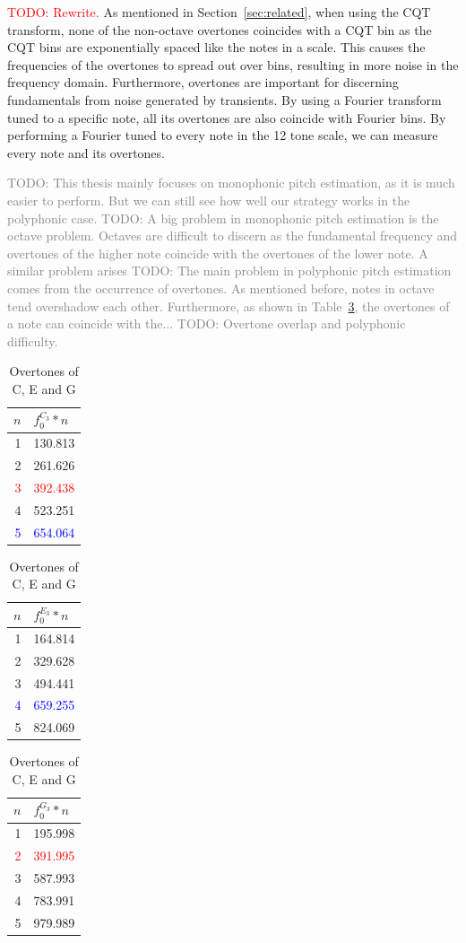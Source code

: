 \documentclass[10pt,twocolumn]{article}
\begin{document}
\textcolor{red}{TODO: Rewrite.}
As mentioned in Section~\ref{sec:related}, when using the CQT transform, none of the non-octave overtones coincides with a CQT bin as the CQT bins are exponentially spaced like the notes in a scale. This causes the frequencies of the overtones to spread out over bins, resulting in more noise in the frequency domain. Furthermore, overtones are important for discerning fundamentals from noise generated by transients. By using a Fourier transform tuned to a specific note, all its overtones are also coincide with Fourier bins. By performing a Fourier tuned to every note in the 12 tone scale, we can measure every note and its overtones.

\textcolor{gray}{TODO: This thesis mainly focuses on monophonic pitch estimation, as it is much easier to perform. But we can still see how well our strategy works in the polyphonic case.
TODO: A big problem in monophonic pitch estimation is the octave problem. Octaves are difficult to discern as the fundamental frequency and overtones of the higher note coincide with the overtones of the lower note. A similar problem arises
TODO: The main problem in polyphonic pitch estimation comes from the occurrence of overtones. As mentioned before, notes in octave tend overshadow each other. Furthermore, as shown in Table~\ref{tab:overtones}, the overtones of a note can coincide with the...
TODO: Overtone overlap and polyphonic difficulty.}
\begin{table}[H]
    \centering
    \hfill
    \begin{tabular}{r|l}
        $n$ & $f^{C_3}_0*n$ \\
        \hline
        1 & 130.813 \\
        2 & 261.626 \\
        \textcolor{red}{3} & \textcolor{red}{392.438} \\
        4 & 523.251 \\
        \textcolor{blue}{5} & \textcolor{blue}{654.064}
    \end{tabular}
    \hfill
    \begin{tabular}{r|l}
        $n$ & $f^{E_3}_0*n$ \\
        \hline
        1 & 164.814 \\
        2 & 329.628 \\
        3 & 494.441 \\
        \textcolor{blue}{4} & \textcolor{blue}{659.255} \\
        5 & 824.069
    \end{tabular}
    \hfill
    \begin{tabular}{r|l}
        $n$ & $f^{G_3}_0*n$ \\
        \hline
        1 & 195.998 \\
        \textcolor{red}{2} & \textcolor{red}{391.995} \\
        3 & 587.993 \\
        4 & 783.991 \\
        5 & 979.989
    \end{tabular}
    \hfill
    \caption{Overtones of C, E and G}
    \label{tab:overtones}
\end{table}
\end{document}
